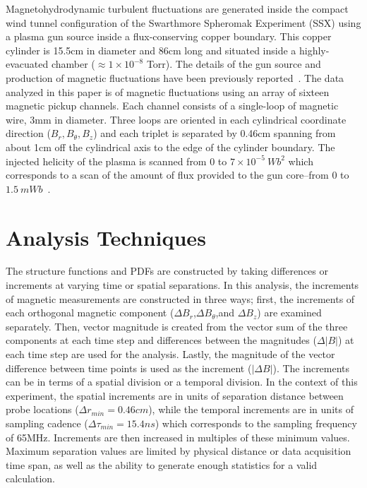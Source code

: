 \documentclass[preprint2]{aastex}
\begin{document}
Magnetohydrodynamic turbulent fluctuations are generated inside the compact wind tunnel configuration of the Swarthmore Spheromak Experiment (SSX) using a plasma gun source inside a flux-conserving copper boundary. This copper cylinder is 15.5cm in diameter and 86cm long and situated inside a highly-evacuated chamber ($\approx 1 \times 10^{-8}$ Torr). The details of the gun source and production of magnetic fluctuations have been previously reported~\citep{schaffner2014c,brown14,brown15a}. The data analyzed in this paper is of magnetic fluctuations using an array of sixteen magnetic pickup channels. Each channel consists of a single-loop of magnetic wire, 3mm in diameter. Three loops are oriented in each cylindrical coordinate direction ($B_{r},B_{\theta},B_{z}$) and each triplet is separated by 0.46cm spanning from about 1cm off the cylindrical axis to the edge of the cylinder boundary. The injected helicity of the plasma is scanned from $0$ to $7\times 10^{-5}~Wb^{2}$ which corresponds to a scan of the amount of flux provided to the gun core--from $0$ to $1.5~mWb$~\citep{schaffner2014b}.

\section{Analysis Techniques}\label{sec:analysis}

The structure functions and PDFs are constructed by taking differences or increments at varying time or spatial separations. In this analysis, the increments of magnetic measurements are constructed in three ways; first, the increments of each orthogonal magnetic component ($\Delta B_r$,$\Delta B_{\theta}$,and $\Delta B_z$) are examined separately. Then, vector magnitude is created from the vector sum of the three components at each time step and differences between the magnitudes ($\Delta |B|$) at each time step are used for the analysis. Lastly, the magnitude of the vector difference between time points is used as the increment ($|\Delta B|$). The increments can be in terms of a spatial division or a temporal division. In the context of this experiment, the spatial increments are in units of separation distance between probe locations ($\Delta r_{min} = 0.46cm$), while the temporal increments are in units of sampling cadence ($\Delta \tau_{min} = 15.4ns$) which corresponds to the sampling frequency of 65MHz. Increments are then increased in multiples of these minimum values. Maximum separation values are limited by physical distance or data acquisition time span, as well as the ability to generate enough statistics for a valid calculation.
\end{document}
